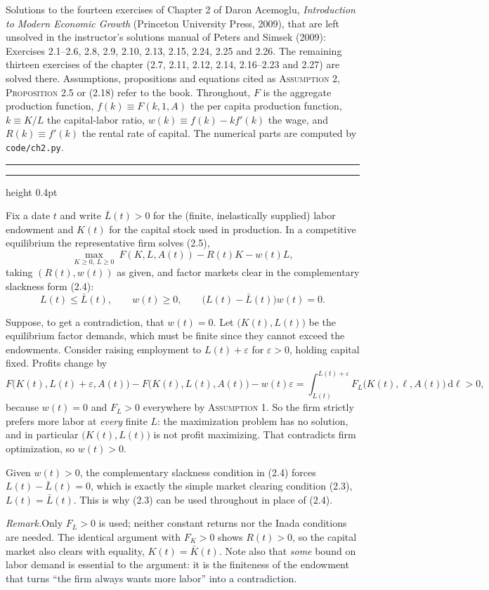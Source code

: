 \documentclass[11pt,letterpaper,reqno]{amsart}
\makeatletter
\newcommand{\dd}{\,\mathrm{d}}
\newcommand{\as@head}[3]{%
  \par\addvspace{1.6ex}\penalty-200\relax
  \phantomsection
  \addcontentsline{toc}{subsection}{#1 #2\texorpdfstring{\ifx\relax#3\relax\else\quad #3\fi}{}}%
  {\color{RuleGrey}\hrule height 0.4pt}%
  \nobreak\vspace{0.8ex}\nobreak
  \noindent{\bfseries #1 #2}%
  \ifx\relax#3\relax\else\quad{\bfseries\itshape #3}\fi
  \par\nobreak\vspace{0.4ex}\nobreak
  \as@beginstatement
}
\newcommand{\as@beginstatement}{\begingroup\itshape\ignorespaces}
\newenvironment{aex}[2]{\as@head{Exercise}{#1}{#2}}{\par\addvspace{1.2ex}}
\newcommand{\rmk}[1]{%
  \par\vspace{0.6ex}%
  {\small\noindent\textit{Remark.}\hspace{0.5em}#1\par}%
  \vspace{0.4ex}%
}
\newcommand{\bk}[1]{\textup{\textsc{#1}}}
\renewcommand{\as@beginstatement}{\ignorespaces}
\makeatother
\begin{document}
\begin{center}
\begin{minipage}{0.86\textwidth}
\small
Solutions to the fourteen exercises of Chapter 2 of Daron Acemoglu, \emph{Introduction to Modern Economic
Growth} (Princeton University Press, 2009), that are left unsolved in the instructor's solutions manual of
Peters and Simsek (2009): Exercises 2.1--2.6, 2.8, 2.9, 2.10, 2.13, 2.15, 2.24, 2.25 and 2.26.  The
remaining thirteen exercises of the chapter (2.7, 2.11, 2.12, 2.14, 2.16--2.23 and 2.27) are solved there.
Assumptions, propositions and equations cited as \bk{Assumption 2}, \bk{Proposition 2.5} or \bk{(2.18)}
refer to the book.  Throughout, $F$ is the aggregate production function, $f(k)\equiv F(k,1,A)$ the per
capita production function, $k\equiv K/L$ the capital-labor ratio, $w(k)\equiv f(k)-kf'(k)$ the wage, and
$R(k)\equiv f'(k)$ the rental rate of capital.  The numerical parts are computed by \texttt{code/ch2.py}.
\end{minipage}
\end{center}

\bigskip
\hrule
\bigskip

\begin{aex}{2.1}{}
Fix a date $t$ and write $\bar L(t)>0$ for the (finite, inelastically supplied) labor endowment and
$K(t)$ for the capital stock used in production.  In a competitive equilibrium the representative firm
solves \bk{(2.5)},
\[
\max_{K\ge0,\,L\ge0}\ F(K,L,A(t))-R(t)K-w(t)L,
\]
taking $(R(t),w(t))$ as given, and factor markets clear in the complementary slackness form \bk{(2.4)}:
\[
L(t)\le\bar L(t),\qquad w(t)\ge0,\qquad \bigl(L(t)-\bar L(t)\bigr)w(t)=0 .
\]

Suppose, to get a contradiction, that $w(t)=0$.  Let $\bigl(K(t),L(t)\bigr)$ be the equilibrium factor
demands, which must be finite since they cannot exceed the endowments.  Consider raising employment to
$L(t)+\varepsilon$ for $\varepsilon>0$, holding capital fixed.  Profits change by
\[
F\bigl(K(t),L(t)+\varepsilon,A(t)\bigr)-F\bigl(K(t),L(t),A(t)\bigr)-w(t)\varepsilon
=\int_{L(t)}^{L(t)+\varepsilon}F_L\bigl(K(t),\ell,A(t)\bigr)\dd\ell>0,
\]
because $w(t)=0$ and $F_L>0$ everywhere by \bk{Assumption 1}.  So the firm strictly prefers more labor at
\emph{every} finite $L$: the maximization problem has no solution, and in particular
$\bigl(K(t),L(t)\bigr)$ is not profit maximizing.  That contradicts firm optimization, so $w(t)>0$.

Given $w(t)>0$, the complementary slackness condition in \bk{(2.4)} forces $L(t)-\bar L(t)=0$, which is
exactly the simple market clearing condition \bk{(2.3)}, $L(t)=\bar L(t)$.  This is why \bk{(2.3)} can be
used throughout in place of \bk{(2.4)}.

\rmk{Only $F_L>0$ is used; neither constant returns nor the Inada conditions are needed.  The identical
argument with $F_K>0$ shows $R(t)>0$, so the capital market also clears with equality,
$K(t)=\bar K(t)$.  Note also that \emph{some} bound on labor demand is essential to the argument: it is the
finiteness of the endowment that turns ``the firm always wants more labor'' into a contradiction.}
\end{aex}
\end{document}
